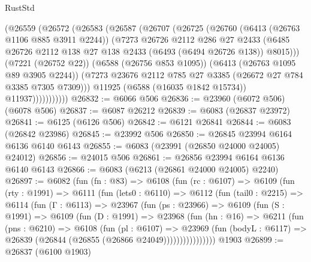 \begin{lexlean}{RustStd}
\begin{coremodule}
                (@26559
                  (@26572
                    (@26583
                      (@26587
                        (@26707
                          (@26725
                            (@26760
                              (@6413 (@26763 @1106 @885 @3911 @2244))
                              (@7273
                                @26726
                                @2112
                                @286
                                @27
                                @2433
                                (@6485
                                  @26726
                                  @2112
                                  @138
                                  @27
                                  @138
                                  @2433
                                  (@6493 (@6494 @26726 @138))
                                  @8015)))
                            (@7221 (@26752 @22))
                            (@6588 (@26756 @853 @1095))
                            (@6413 (@26763 @1095 @89 @3905 @2244))
                            (@7273 @23676 @2112 @785 @27 @3385 (@26672 @27 @784 @3385 @7305 @7309)))
                          @11925
                          (@6588 (@16035 @1842 @15734))
                          @11937)))))))))))
@26832 := @6066 @506
@26836 := @23960 (@6072 @506) (@6078 @506)
@26837 := @6087 @26212
@26839 := @6083 (@26837 @23972)
@26841 := @6125 (@6126 @506)
@26842 := @6121 @26841
@26844 := @6083 (@26842 @23986)
@26845 := @23992 @506
@26850 := @26845 @23994 @6164 @6136 @6140 @6143
@26855 := @6083 (@23991 (@26850 @24000 @24005) @24012)
@26856 := @24015 @506
@26861 := @26856 @23994 @6164 @6136 @6140 @6143
@26866 := @6083 (@6213 (@26861 @24000 @24005) @2240)
@26897 := @6082
    (fun (fn : @83) =>
    @6108
      (fun (rc : @6107) =>
      @6109
        (fun (rty : @1991) =>
        @6111
          (fun (lets0 : @6110) =>
          @6112
            (fun (tail0 : @2215) =>
            @6114
              (fun (Γ : @6113) =>
              @23967
                (fun (ps : @23966) =>
                @6109
                  (fun (S : @1991) =>
                  @6109
                    (fun (D : @1991) =>
                    @23968
                      (fun (hn : @16) =>
                      @6211
                        (fun (pns : @6210) =>
                        @6108
                          (fun (pl : @6107) =>
                          @23969
                            (fun (bodyL : @6117) =>
                            @26839 (@26844 (@26855 (@26866 @24049))))))))))))))))
    @1903
@26899 := @26837 (@6100 @1903)

\end{coremodule}
\end{lexlean}
